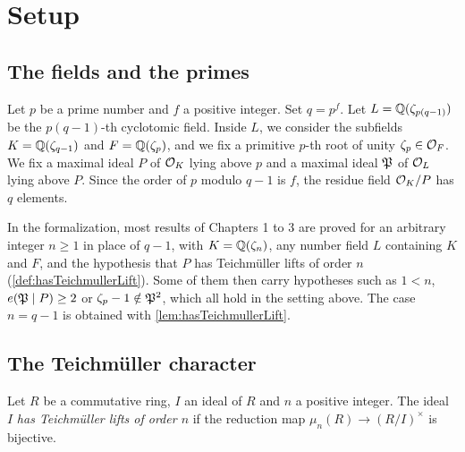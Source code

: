 %

\chapter{Setup}

\section{The fields and the primes}

Let $p$ be a prime number and $f$ a positive integer. Set $q = p^f$.
Let $L = \mathbb{Q}(\zeta_{p(q-1)})$ be the $p(q-1)$-th cyclotomic field. Inside $L$, we
consider the subfields $K = \mathbb{Q}(\zeta_{q-1})$ and $F = \mathbb{Q}(\zeta_p)$, and we fix a primitive
$p$-th root of unity $\zeta_p \in \mathcal{O}_F$. We fix a maximal ideal $P$ of $\mathcal{O}_K$ lying above $p$
and a maximal ideal $\mathfrak{P}$ of $\mathcal{O}_L$ lying above $P$. Since the order of $p$ modulo $q - 1$ is
$f$, the residue field $\mathcal{O}_K/P$ has $q$ elements.

\begin{remark}
  In the formalization, most results of Chapters 1 to 3 are proved for an arbitrary integer
  $n \geq 1$ in place of $q - 1$, with $K = \mathbb{Q}(\zeta_n)$, any number field $L$ containing $K$
  and $F$, and the hypothesis that $P$ has Teichmüller lifts of order $n$
  (\ref{def:hasTeichmullerLift}). Some of them then carry hypotheses such as $1 < n$,
  $e(\mathfrak{P} \mid P) \geq 2$ or $\zeta_p - 1 \notin \mathfrak{P}^2$, which all hold in the setting above.
  The case $n = q - 1$ is obtained with \ref{lem:hasTeichmullerLift}.
\end{remark}

\section{The Teichmüller character}

\begin{definition}
  \label{def:hasTeichmullerLift}
  \leanok
  Let $R$ be a commutative ring, $I$ an ideal of $R$ and $n$ a positive integer. The ideal $I$
  \emph{has Teichmüller lifts of order $n$} if the reduction map
  $\mu_n(R) \to (R/I)^\times$ is bijective.
\end{definition}

